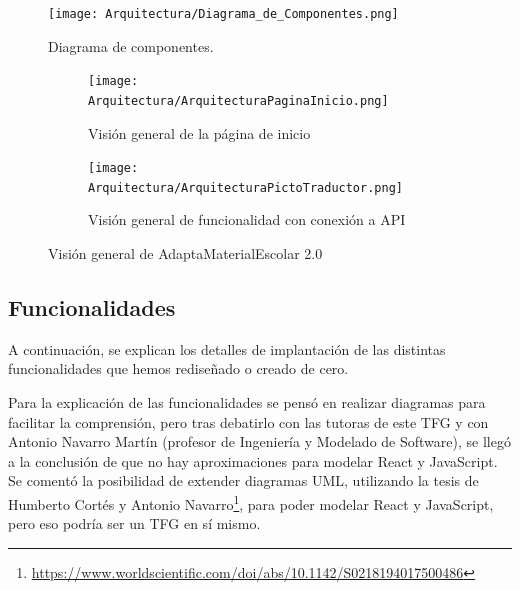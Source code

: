 \begin{figure}[ht!]
  \centering
  \texttt{[image: Arquitectura/Diagrama\_de\_Componentes.png]}
  \caption{Diagrama de componentes.}
  \label{fig:diagramaComponentes}
\end{figure}

\begin{figure}[ht!]
  \centering
  \begin{subfigure}{\textwidth}
    \centering
    \texttt{[image: Arquitectura/ArquitecturaPaginaInicio.png]}
    \caption{Visión general de la página de inicio}
    \label{fig:arquitecturageneral1}
  \end{subfigure}

  \begin{subfigure}{\textwidth}
    \centering
    \texttt{[image: Arquitectura/ArquitecturaPictoTraductor.png]}
    \caption{Visión general de funcionalidad con conexión a API}
    \label{fig:arquitecturageneral2}
  \end{subfigure}
  \caption{Visión general de AdaptaMaterialEscolar 2.0}
  \label{fig:arquitecturageneral}
\end{figure}

\subsection{Funcionalidades}
A continuación, se explican los detalles de implantación de las distintas funcionalidades que hemos rediseñado o creado de cero.

Para la explicación de las funcionalidades se pensó en realizar diagramas para facilitar la comprensión, pero tras debatirlo con las tutoras de este TFG y con Antonio Navarro Martín (profesor de Ingeniería y Modelado de Software), se llegó a la conclusión de que no hay aproximaciones para modelar React y JavaScript. Se comentó la posibilidad de extender diagramas UML, utilizando la tesis de Humberto Cortés y Antonio Navarro\footnote{\url{https://www.worldscientific.com/doi/abs/10.1142/S0218194017500486}}, para poder modelar React y JavaScript, pero eso podría ser un TFG en sí mismo.


